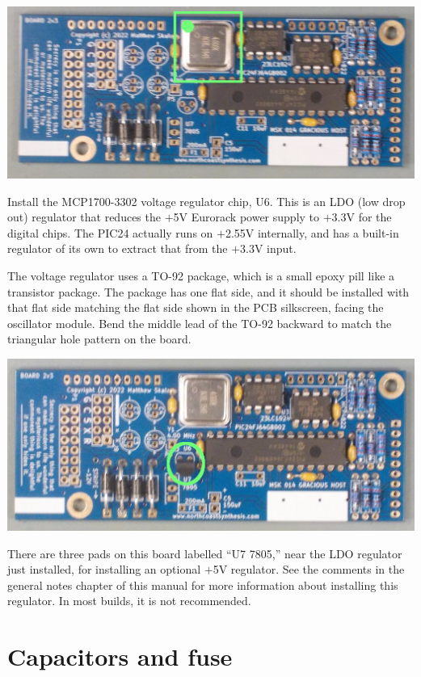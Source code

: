\nopagebreak
\noindent\includegraphics[width=\linewidth]{crystal.jpg}

Install the MCP1700-3302 voltage regulator chip, U6.  This is an LDO (low
drop out) regulator that reduces the $+$5V Eurorack power supply to $+$3.3V
for the digital chips.  The PIC24 actually runs on $+$2.55V internally, and
has a built-in regulator of its own to extract that from the $+$3.3V input.

The voltage regulator uses a TO-92 package, which is a small epoxy
pill like a transistor package.  The package has one flat side, and it
should be installed with that flat side matching the flat side shown in the
PCB silkscreen, facing the oscillator module.  Bend the middle lead of the
TO-92 backward to match the triangular hole pattern on the board.

\nopagebreak
\noindent\includegraphics[width=\linewidth]{mcp1700-3302.jpg}

There are three pads on this board labelled ``U7 7805,'' near the LDO
regulator just installed, for installing an optional
$+$5V regulator.  See the comments in the general notes chapter of this
manual for more information about installing this regulator.  In most
builds, it is not recommended.

\section{Capacitors and fuse}

